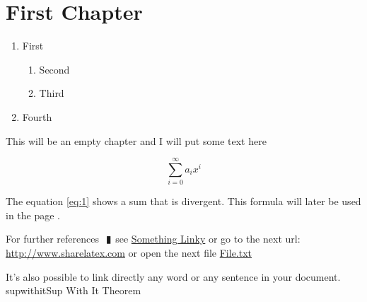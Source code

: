 \documentclass{book}
\newcommand{\df}[1]{#1}
\newcommand{\pipe}{$\phantom{(}\vrectangleblack\phantom{)}$}
\begin{document}
\chapter{First Chapter}

\begin{enumerate}
  \item First
  \begin{enumerate}
    \item Second
    \item Third
  \end{enumerate}
  \item Fourth
\end{enumerate}


This will be an empty chapter and I will put some text here

\begin{equation}
\label{eq:1}
\sum_{i=0}^{\infty} a_i x^i
\end{equation}

The equation \ref{eq:1} shows a sum that is divergent. This formula 
will later be used in the page \pageref{second}.

For further references \pipe see \href{http://www.sharelatex.com}{Something 
Linky} or go to the next url: \url{http://www.sharelatex.com} or open 
the next file \href{run:./file.txt}{File.txt}

It's also possible to link directly any word or 
\hypertarget{thesentence}{any sentence} in your document.
\df{supwithit}{Sup With It Theorem}
\end{document}
